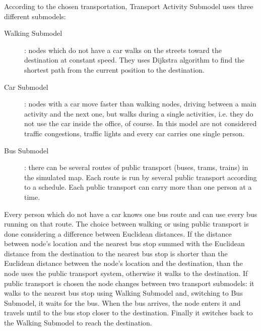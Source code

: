 According to the chosen transportation, Transport Activity Submodel uses three different submodels:
\\

\begin{description}
\item [Walking Submodel]: nodes which do not have a car walks on the streets toward the destination at constant speed. They uses Dijkstra algorithm to find the shortest path from the current position to the destination.

\item [Car Submodel]: nodes with a car move faster than walking nodes, driving between a main activity and the next one, but walks during a single activities, i.e. they do not use the car inside the office, of course. In this model are not considered traffic congestions, traffic lights and every car carries one single person.

\item [Bus Submodel]: there can be several routes of public transport (buses, trams, trains) in the simulated map. Each route is run by several public transport according to a schedule. Each public transport can carry more than one person at a time.
\end{description}

Every person which do not have a car knows one bus route and can use every bus running on that route. The choice between walking or using public transport is done considering a difference between Euclidean distances. If the distance between node's location and the nearest bus stop summed with the Euclidean distance from the destination to the nearest bus stop is shorter than the Euclidean distance between the node's location and the destination, than the node uses the public transport system, otherwise it walks to the destination. If public transport is chosen the node changes between two transport submodels: it walks to the nearest bus stop using Walking Submodel and, switching to Bus Submodel, it waits for the bus. When the bus arrives, the node enters it and travels until to the bus stop closer to the destination. Finally it switches back to the Walking Submodel to reach the destination.
 
 


